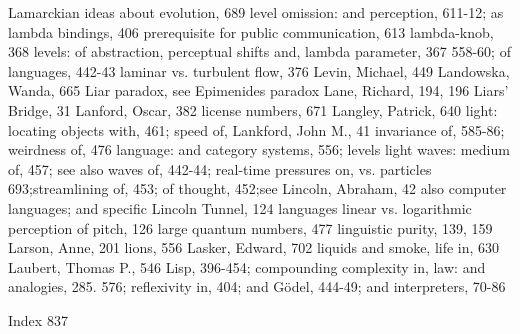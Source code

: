 Lamarckian ideas about evolution, 689           level omission: and perception, 611-12; as
lambda bindings, 406                              prerequisite for public communication, 613
lambda-knob, 368                                levels: of abstraction, perceptual shifts and,
lambda parameter, 367                             558-60; of languages, 442-43
laminar vs. turbulent flow, 376                 Levin, Michael, 449
Landowska, Wanda, 665                           Liar paradox, see Epimenides paradox
Lane, Richard, 194, 196                         Liars' Bridge, 31
Lanford, Oscar, 382                             license numbers, 671
Langley, Patrick, 640                           light: locating objects with, 461; speed of,
Lankford, John M., 41                             invariance of, 585-86; weirdness of, 476
language: and category systems, 556; levels       light waves: medium of, 457; see also waves
  of, 442-44; real-time pressures on,             vs. particles
  693;streamlining of, 453; of thought, 452;see Lincoln, Abraham, 42
  also computer languages; and specific         Lincoln Tunnel, 124
  languages                                     linear vs. logarithmic perception of pitch, 126
large quantum numbers, 477                      linguistic purity, 139, 159
Larson, Anne, 201                               lions, 556
Lasker, Edward, 702                             liquids and smoke, life in, 630
Laubert, Thomas P., 546                         Lisp, 396-454; compounding complexity in,
law: and analogies, 285. 576; reflexivity in,     404; and Gödel, 444-49; and interpreters,
  70-86

 Index                                                                                     837

